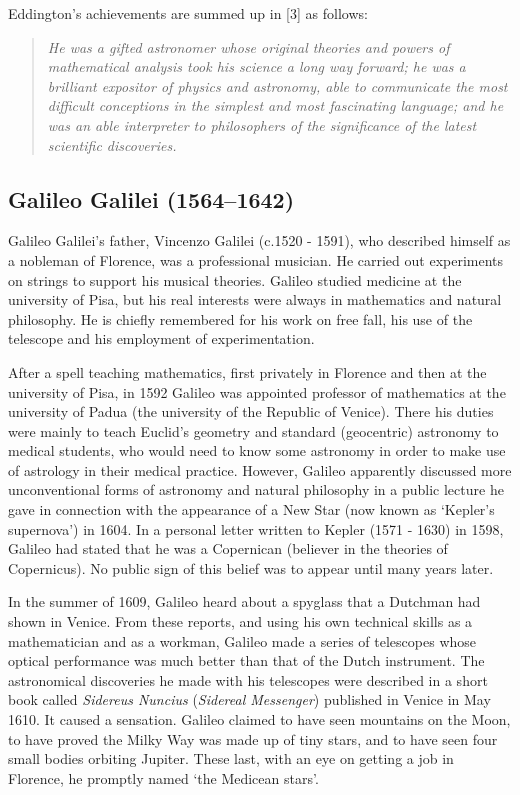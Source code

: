 Eddington's achievements are summed up in [3] as follows:
\begin{quote}
\textit{He was a gifted astronomer whose original theories and powers of mathematical analysis took his science a long way forward; he was a brilliant expositor of physics and astronomy, able to communicate the most difficult conceptions in the simplest and most fascinating language; and he was an able interpreter to philosophers of the significance of the latest scientific discoveries.}
\end{quote}


\subsection[Galileo \scshape{Galilei}]{Galileo Galilei (1564--1642)}\label{bio:galileo}
Galileo Galilei's father, Vincenzo Galilei (c.1520 - 1591), who described himself as a nobleman of Florence, was a professional musician. He carried out experiments on strings to support his musical theories. Galileo studied medicine at the university of Pisa, but his real interests were always in mathematics and natural philosophy. He is chiefly remembered for his work on free fall, his use of the telescope and his employment of experimentation.

After a spell teaching mathematics, first privately in Florence and then at the university of Pisa, in 1592 Galileo was appointed professor of mathematics at the university of Padua (the university of the Republic of Venice). There his duties were mainly to teach Euclid's geometry and standard (geocentric) astronomy to medical students, who would need to know some astronomy in order to make use of astrology in their medical practice. However, Galileo apparently discussed more unconventional forms of astronomy and natural philosophy in a public lecture he gave in connection with the appearance of a New Star (now known as ‘Kepler's supernova’) in 1604. In a personal letter written to Kepler (1571 - 1630) in 1598, Galileo had stated that he was a Copernican (believer in the theories of Copernicus). No public sign of this belief was to appear until many years later.

In the summer of 1609, Galileo heard about a spyglass that a Dutchman had shown in Venice. From these reports, and using his own technical skills as a mathematician and as a workman, Galileo made a series of telescopes whose optical performance was much better than that of the Dutch instrument. The astronomical discoveries he made with his telescopes were described in a short book called \textit{Sidereus Nuncius} (\textit{Sidereal Messenger}) published in Venice in May 1610. It caused a sensation. Galileo claimed to have seen mountains on the Moon, to have proved the Milky Way was made up of tiny stars, and to have seen four small bodies orbiting Jupiter. These last, with an eye on getting a job in Florence, he promptly named ‘the Medicean stars’.

